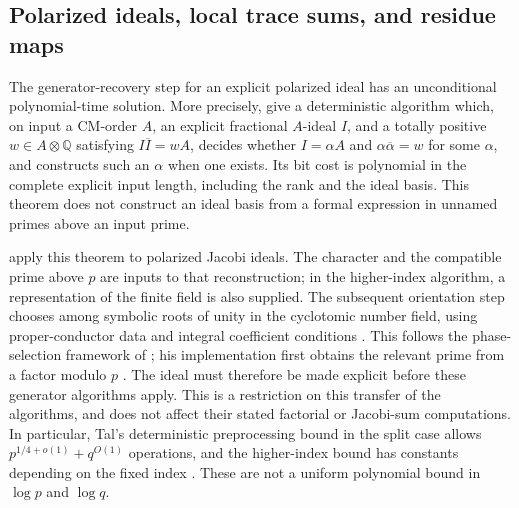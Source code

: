 \documentclass[11pt]{article}
\newcommand{\Q}{\mathbb Q}
\theoremstyle{definition}
\theoremstyle{remark}
\begin{document}
\subsection{Polarized ideals, local trace sums, and residue maps}
\label{sec:polarized-local-residues}

The generator-recovery step for an explicit polarized ideal has an
unconditional polynomial-time solution.  More precisely,
\citet[Theorem~1.3, author manuscript p.~2]{LenstraSilverberg2019CMOrders}
give a deterministic algorithm which, on input a CM-order $A$, an
explicit fractional $A$-ideal $I$, and a totally positive
$w\in A\otimes\Q$ satisfying $I\overline I=wA$, decides whether
$I=\alpha A$ and $\alpha\overline\alpha=w$ for some $\alpha$, and
constructs such an $\alpha$ when one exists.  Its bit cost is polynomial
in the complete explicit input length, including the rank and the ideal
basis.  This theorem does not construct an ideal basis from a formal
expression in unnamed primes above an input prime.

\citet[Theorem~2.7 and \S\S2.6, 3.1--3.3, pp.~25--31]{Tal2026ModularFactorials}
apply this theorem to polarized Jacobi ideals.  The character and the
compatible prime above $p$ are inputs to that reconstruction; in the
higher-index algorithm, a representation of the finite field is also
supplied.  The subsequent orientation step chooses among symbolic
roots of unity in the cyclotomic number field, using proper-conductor
data and integral coefficient conditions
\citep[Lemma~2.8, pp.~27--28; Appendix~G, pp.~63--65]{Tal2026ModularFactorials}.
This follows the phase-selection framework of
\citet[Theorem~9, pp.~9--10]{VanWamelen2002Jacobi}; his implementation
first obtains the relevant prime from a factor modulo $p$
\citep[\S4, p.~4; \S7, pp.~18--19]{VanWamelen2002Jacobi}.
The ideal must therefore be made explicit before these generator
algorithms apply.  This is a restriction on this transfer of the
algorithms, and does not affect their stated factorial or Jacobi-sum
computations.  In particular, Tal's deterministic preprocessing bound
in the split case allows $p^{1/4+o(1)}+q^{O(1)}$ operations, and the
higher-index bound has constants depending on the fixed index
\citep[Theorem~1.3, pp.~6--7; \S1.3, pp.~12--14; \S4.2, p.~33]
{Tal2026ModularFactorials}.  These are not a uniform polynomial bound
in $\log p$ and $\log q$.
\end{document}
